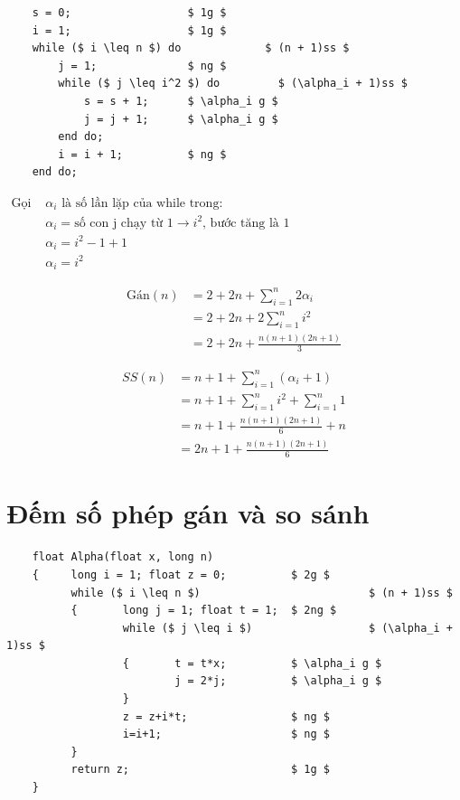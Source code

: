 \documentclass[12pt, letterpaper]{article}
\begin{document}
\begin{lstlisting}
    s = 0;                  $ 1g $
    i = 1;                  $ 1g $
    while ($ i \leq n $) do             $ (n + 1)ss $
        j = 1;              $ ng $
        while ($ j \leq i^2 $) do         $ (\alpha_i + 1)ss $
            s = s + 1;      $ \alpha_i g $
            j = j + 1;      $ \alpha_i g $
        end do;
        i = i + 1;          $ ng $
    end do;
  \end{lstlisting}

$ \begin{aligned}
		\text{Gọi } & \alpha_i \text{ là số lần lặp của while trong:}                              \\
		            & \alpha_i = \text{số con j chạy từ 1} \rightarrow i^2 \text{, bước tăng là 1} \\
		            & \alpha_i = i^2 - 1 + 1                                                       \\
		            & \alpha_i = i^2
	\end{aligned} $

\begin{align*}
	\text{Gán}(n) & = 2 + 2n + \sum^{n}_{i = 1} 2 \alpha_i \\
	              & = 2 + 2n + 2 \sum^{n}_{i = 1} i^2      \\
	              & = 2 + 2n + \frac{n(n + 1)(2n + 1)}{3}
\end{align*}

\begin{align*}
	SS(n) & = n + 1 + \sum^{n}_{i = 1} (\alpha_i + 1)           \\
	      & = n + 1 + \sum^{n}_{i = 1} i^2 + \sum^{n}_{i = 1} 1 \\
	      & = n + 1 + \frac{n(n + 1)(2n + 1)}{6} + n            \\
	      & = 2n + 1 + \frac{n(n + 1)(2n + 1)}{6}
\end{align*}

\section{Đếm số phép gán và so sánh}

\begin{lstlisting}
    float Alpha(float x, long n)
    {     long i = 1; float z = 0;          $ 2g $
          while ($ i \leq n $)                          $ (n + 1)ss $
          {       long j = 1; float t = 1;  $ 2ng $
                  while ($ j \leq i $)                  $ (\alpha_i + 1)ss $
                  {       t = t*x;          $ \alpha_i g $
                          j = 2*j;          $ \alpha_i g $
                  }
                  z = z+i*t;                $ ng $
                  i=i+1;                    $ ng $
          }
          return z;                         $ 1g $
    }
\end{lstlisting}
\end{document}
